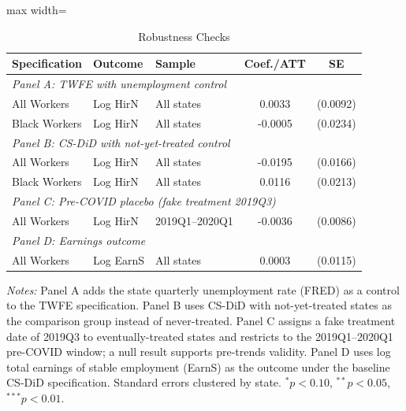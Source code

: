 \begin{table}[htbp]
\centering
\caption{Robustness Checks}
\label{tab:robust}
\begin{adjustbox}{max width=\textwidth}
\begin{threeparttable}
\begin{tabular}{lllcc}
\hline\hline
Specification & Outcome & Sample & Coef./ATT & SE \\
\hline
\multicolumn{5}{l}{\textit{Panel A: TWFE with unemployment control}} \\
\quad All Workers & Log HirN & All states & 0.0033 & (0.0092) \\
\quad Black Workers & Log HirN & All states & -0.0005 & (0.0234) \\[4pt]
\multicolumn{5}{l}{\textit{Panel B: CS-DiD with not-yet-treated control}} \\
\quad All Workers & Log HirN & All states & -0.0195 & (0.0166) \\
\quad Black Workers & Log HirN & All states & 0.0116 & (0.0213) \\[4pt]
\multicolumn{5}{l}{\textit{Panel C: Pre-COVID placebo (fake treatment 2019Q3)}} \\
\quad All Workers & Log HirN & 2019Q1--2020Q1 & -0.0036 & (0.0086) \\[4pt]
\multicolumn{5}{l}{\textit{Panel D: Earnings outcome}} \\
\quad All Workers & Log EarnS & All states & 0.0003 & (0.0115) \\
\hline\hline
\end{tabular}
\begin{tablenotes}[flushleft]
\footnotesize
\textit{Notes:} Panel A adds the state quarterly unemployment rate (FRED) as a control to the TWFE specification. Panel B uses CS-DiD with not-yet-treated states as the comparison group instead of never-treated. Panel C assigns a fake treatment date of 2019Q3 to eventually-treated states and restricts to the 2019Q1--2020Q1 pre-COVID window; a null result supports pre-trends validity. Panel D uses log total earnings of stable employment (EarnS) as the outcome under the baseline CS-DiD specification. Standard errors clustered by state. $^{*}p<0.10$, $^{**}p<0.05$, $^{***}p<0.01$.
\end{tablenotes}
\end{threeparttable}
\end{adjustbox}
\end{table}
